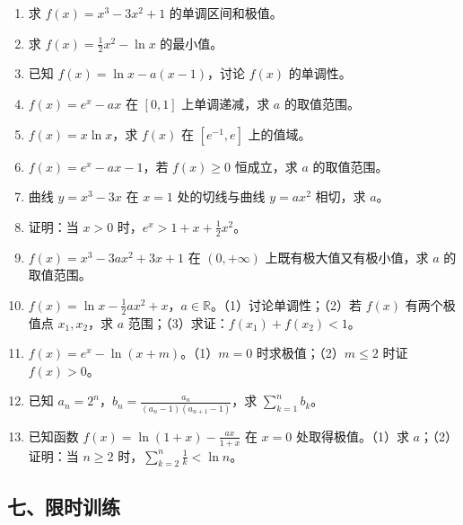\begin{enumerate}
  \item[★] 求 $f(x)=x^3-3x^2+1$ 的单调区间和极值。
  \vspace{2.5cm}
  \item[★] 求 $f(x)=\frac12x^2-\ln x$ 的最小值。
  \vspace{2.5cm}
  \item[★★] 已知 $f(x)=\ln x - a(x-1)$，讨论 $f(x)$ 的单调性。
  \vspace{3cm}
  \item[★★] $f(x)=e^x-ax$ 在 $[0,1]$ 上单调递减，求 $a$ 的取值范围。
  \vspace{2cm}
  \item[★★] $f(x)=x\ln x$，求 $f(x)$ 在 $[e^{-1},e]$ 上的值域。
  \vspace{2.5cm}
  \item[★★] $f(x)=e^x-ax-1$，若 $f(x)\ge0$ 恒成立，求 $a$ 的取值范围。
  \vspace{3cm}
  \item[★★] 曲线 $y=x^3-3x$ 在 $x=1$ 处的切线与曲线 $y=ax^2$ 相切，求 $a$。
  \vspace{2.5cm}
  \item[★★] 证明：当 $x>0$ 时，$e^x > 1+x+\frac12x^2$。
  \vspace{2.5cm}
  \item[★★★] $f(x)=x^3-3ax^2+3x+1$ 在 $(0,+\infty)$ 上既有极大值又有极小值，求 $a$ 的取值范围。
  \vspace{3cm}
  \item[★★★] $f(x)=\ln x - \frac12ax^2 + x$，$a\in\mathbb{R}$。（1）讨论单调性；（2）若 $f(x)$ 有两个极值点 $x_1,x_2$，求 $a$ 范围；（3）求证：$f(x_1)+f(x_2) < 1$。
  \vspace{5cm}
  \item[★★★] $f(x)=e^x - \ln(x+m)$。（1）$m=0$ 时求极值；（2）$m\le2$ 时证 $f(x)>0$。
  \vspace{5cm}
  \item[★★★] 已知 $a_n=2^n$，$b_n=\frac{a_n}{(a_n-1)(a_{n+1}-1)}$，求 $\sum_{k=1}^n b_k$。
  \vspace{4cm}
  \item[★★★] 已知函数 $f(x)=\ln(1+x) - \frac{ax}{1+x}$ 在 $x=0$ 处取得极值。（1）求 $a$；（2）证明：当 $n\ge2$ 时，$\sum_{k=2}^n \frac1k < \ln n$。
  \vspace{5cm}
\end{enumerate}

\subsection{七、限时训练}

